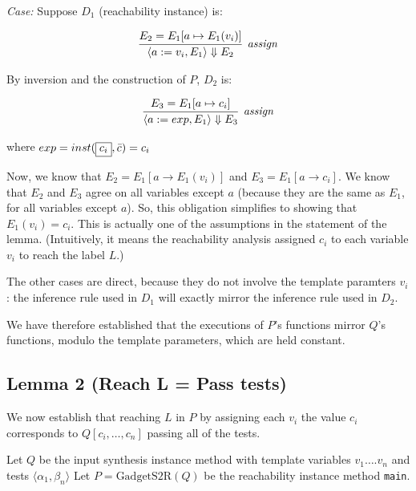 \documentclass[11pt]{article}
\begin{document}
\vspace{1ex}
\noindent \emph{Case:} Suppose $D_1$ (reachability instance) is:

 \[
\begin{array}{c}

\infer[\textit{assign}]
{ \langle a := v_i, E_1 \rangle \Downarrow E_2} {E_2 = E_1 [ a
  \mapsto E_1(v_i)] }
\end{array}
\]


\noindent By inversion and the construction of $P$, $D_2$ is: 

\[
\begin{array}{c}

\infer[\textit{assign}]
{ \langle a := exp, E_1 \rangle \Downarrow E_3} {E_3 = E_1 [ a
  \mapsto c_i] }
\end{array}
\]

\noindent 
where $exp = inst(\fbox{$\displaystyle c_i $}, \bar{c}) = c_i$

Now, we know that $E_2 = E_1 [ a \rightarrow E_1(v_i) ]$ and
$E_3 = E_1 [ a \rightarrow c_i ]$. We know that $E_2$ and $E_3$ agree on all
variables except $a$ (because they are the same as $E_1$, for all variables
except $a$). So, this obligation simplifies to showing that $E_1 (v_i) = c_i.$
This is actually one of the assumptions in the statement of the lemma.
(Intuitively, it means the reachability analysis assigned $c_i$ to each variable
$v_i$ to reach the label $L$.)

\vspace{1ex}
The other cases are direct, because they do not involve the template paramters
$v_i$: the inference rule used in $D_1$ will exactly mirror the inference rule
used in $D_2$.  

We have therefore established that the executions of $P$'s functions mirror $Q$'s
functions, modulo the template parameters, which are held constant.

\subsection{Lemma 2 (Reach L = Pass tests)}

We now establish that reaching $L$ in $P$ by assigning each $v_i$ the value
$c_i$ corresponds to $Q[c_i,\ldots,c_n]$ passing all of the tests. 

Let $Q$ be the input synthesis instance method with template variables
$v_1 \ldots. v_n$ and tests $\langle\alpha_1, \beta_n\rangle$ Let
$P = \mbox{GadgetS2R}(Q)$ be the reachability instance method \texttt{main}. 
\end{document}
